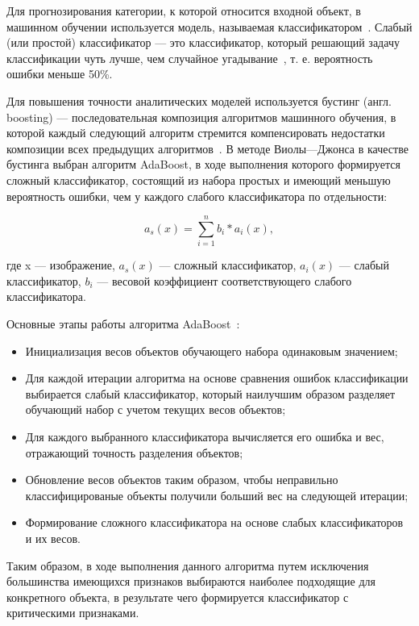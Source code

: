 \begin{enumerate}[label=\arabic*.]
    Для прогнозирования категории, к которой относится входной объект, в машинном обучении используется модель, называемая классификатором~\cite{classifier}. Слабый (или простой) классификатор --- это классификатор, который решающий задачу классификации чуть лучше, чем случайное угадывание~\cite{weak}, т. е. вероятность ошибки меньше 50\%. 

    Для повышения точности аналитических моделей используется бустинг (англ. boosting) --- последовательная композиция алгоритмов машинного обучения, в которой каждый следующий алгоритм стремится компенсировать недостатки композиции всех предыдущих алгоритмов~\cite{tomsk}. 
    В методе Виолы---Джонса в качестве бустинга выбран алгоритм AdaBoost, в ходе выполнения которого формируется сложный классификатор, состоящий из набора простых и имеющий меньшую вероятность ошибки, чем у каждого слабого классификатора по отдельности:

    \begin{equation}
        a_s(x) = \sum_{i=1}^{n}b_i * a_i(x),
    \end{equation}

    где x --- изображение, $a_s(x)$ --- сложный классификатор, $a_i(x)$ --- слабый классификатор, $b_i$ --- весовой коэффициент соответствующего слабого классификатора.

    Основные этапы работы алгоритма AdaBoost~\cite{viola}:

    \begin{itemize}
        \item Инициализация весов объектов обучающего набора одинаковым значением;
        \item Для каждой итерации алгоритма на основе сравнения ошибок классификации выбирается слабый классификатор, который наилучшим образом разделяет обучающий набор с учетом текущих весов объектов;
        \item Для каждого выбранного классификатора вычисляется его ошибка и вес, отражающий точность разделения объектов;
        \item Обновление весов объектов таким образом, чтобы неправильно классифицированые объекты получили больший вес на следующей итерации;
        \item Формирование сложного классификатора на основе слабых классификаторов и их весов.
    \end{itemize}
    
    Таким образом, в ходе выполнения данного алгоритма путем исключения большинства имеющихся признаков выбираются наиболее подходящие для конкретного объекта, в результате чего формируется классификатор с критическими признаками.


\end{enumerate}
